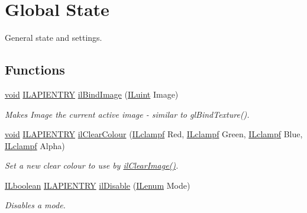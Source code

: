 \hypertarget{group__state}{\section{Global State}
\label{group__state}
}


General state and settings.  


\subsection*{Functions}
\begin{DoxyCompactItemize}
\item 
\hyperlink{_i_l_8h_a5530e04d947bcddd83639ea7940faf10}{void} \hyperlink{_i_l_8h_a69c08a8d06df986f7e46f209d131ef2f}{I\+L\+A\+P\+I\+E\+N\+T\+R\+Y} \hyperlink{group__state_ga1ee59d3004b3fdd25e91da8e41708035}{il\+Bind\+Image} (\hyperlink{group__il__types_gaff8e86a1072c8d7cfe387fb87c6ed8e1}{I\+Luint} Image)
\begin{DoxyCompactList}\small\item\em Makes Image the current active image -\/ similar to gl\+Bind\+Texture(). \end{DoxyCompactList}\item 
\hyperlink{_i_l_8h_a5530e04d947bcddd83639ea7940faf10}{void} \hyperlink{_i_l_8h_a69c08a8d06df986f7e46f209d131ef2f}{I\+L\+A\+P\+I\+E\+N\+T\+R\+Y} \hyperlink{group__state_gaca1dc7f7b8e61eb134060c9c8a8b72f2}{il\+Clear\+Colour} (\hyperlink{group__il__types_gae90d8075bf3ef2cd89c09b26fd4dbef2}{I\+Lclampf} Red, \hyperlink{group__il__types_gae90d8075bf3ef2cd89c09b26fd4dbef2}{I\+Lclampf} Green, \hyperlink{group__il__types_gae90d8075bf3ef2cd89c09b26fd4dbef2}{I\+Lclampf} Blue, \hyperlink{group__il__types_gae90d8075bf3ef2cd89c09b26fd4dbef2}{I\+Lclampf} Alpha)
\begin{DoxyCompactList}\small\item\em Set a new clear colour to use by \hyperlink{group__image__manip_gae48d76d54f6f00fe54b304c29224653f}{il\+Clear\+Image()}. \end{DoxyCompactList}\item 
\hyperlink{group__il__types_gaa6aa7c95cfdc06b4d8601ef832b7bb0a}{I\+Lboolean} \hyperlink{_i_l_8h_a69c08a8d06df986f7e46f209d131ef2f}{I\+L\+A\+P\+I\+E\+N\+T\+R\+Y} \hyperlink{group__state_ga4b5f72e2b4f6b197efed3a64646a6651}{il\+Disable} (\hyperlink{group__il__types_ga62ca73445716183ef42b1f3906a45ed0}{I\+Lenum} Mode)
\begin{DoxyCompactList}\small\item\em Disables a mode. \end{DoxyCompactList}\item 

\end{DoxyCompactItemize}
